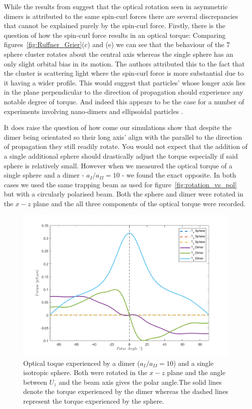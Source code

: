 While the results from \cite{Ruffner2012} suggest that the optical rotation 
seen in asymmetric dimers is attributed to the same spin-curl forces there 
are several discrepancies that cannot be explained purely by the spin-curl 
force. Firstly, there is the question of how the spin-curl force results in
an optical torque: Comparing figures~\ref{fig:Ruffner_Grier}(c) and (e) we 
can see that the behaviour of the 7 sphere cluster rotates about the central 
axis whereas the single sphere has an only slight orbital bias in its motion. 
The authors attributed this to the fact that the cluster is scattering light 
where the spin-curl force is more substantial due to it having a wider profile. 
This would suggest that particles' whose longer axis lies in the plane perpendicular
to the direction of propagation should experience any notable degree of 
torque. And indeed this appears to be the case for a number of experiments 
involving nano-dimers and ellipsoidal particles \cite{Ahn2018, Reimann2018}.

It does raise the question of how come our simulations show that despite the 
dimer being orientated so their long axis' align with the parallel to the 
direction of propagation they still readily rotate. You would not expect that
the addition of a single additional sphere should drastically adjust the torque
especially if said sphere is relatively small. However when we measured the 
optical torque of a single sphere and a dimer - $a_{I}/a_{II}=10$ - we found 
the exact opposite. In both cases we used the same trapping beam as used for
figure~\ref{fig:rotation_vs_pol} but with a circularly polarised beam. Both 
the sphere and dimer were rotated in the $x-z$ plane and the all three components 
of the optical torque were recorded.
\begin{figure}[h!]
	\centering	
	\includegraphics[width=\linewidth]{sphere_dimer_torque.png}
	\caption{Optical toque experienced by a dimer ($a_{I}/a_{II}=10$) and a 
	single isotropic sphere. Both were rotated in the $x-z$ plane and the angle 
	between $U_z$ and the beam axis gives the polar angle.The solid lines denote 
	the torque experienced by the dimer whereas the dashed lines represent the 
	torque experienced by the sphere.}
	\label{fig:sphere_dimer_torque}
\end{figure}

